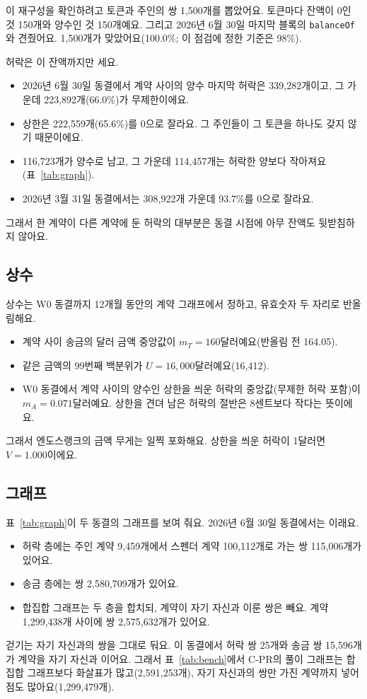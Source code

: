 이 재구성을 확인하려고 토큰과 주인의 쌍 1,500개를 뽑았어요. 토큰마다 잔액이 0인 것 150개와 양수인 것 150개예요. 그리고 2026년 6월 30일 마지막 블록의 \texttt{balanceOf}와 견줬어요. 1,500개가 맞았어요(100.0\%; 이 점검에 정한 기준은 98\%).

허락은 이 잔액까지만 세요.
\begin{itemize}
\item 2026년 6월 30일 동결에서 계약 사이의 양수 마지막 허락은 339,282개이고, 그 가운데 223,892개(66.0\%)가 무제한이에요.
\item 상한은 222,559개(65.6\%)를 0으로 잘라요. 그 주인들이 그 토큰을 하나도 갖지 않기 때문이에요.
\item 116,723개가 양수로 남고, 그 가운데 114,457개는 허락한 양보다 작아져요(표~\ref{tab:graph}).
\item 2026년 3월 31일 동결에서는 308,922개 가운데 93.7\%를 0으로 잘라요.
\end{itemize}
그래서 한 계약이 다른 계약에 둔 허락의 대부분은 동결 시점에 아무 잔액도 뒷받침하지 않아요.

\subsection{상수}
\label{sec:constants}

상수는 W0 동결까지 12개월 동안의 계약 그래프에서 정하고, 유효숫자 두 자리로 반올림해요.
\begin{itemize}
\item 계약 사이 송금의 달러 금액 중앙값이 $m_T=160$달러예요(반올림 전 164.05).
\item 같은 금액의 99번째 백분위가 $U=16{,}000$달러예요(16,412).
\item W0 동결에서 계약 사이의 양수인 상한을 씌운 허락의 중앙값(무제한 허락 포함)이 $m_A=0.071$달러예요. 상한을 견뎌 남은 허락의 절반은 8센트보다 작다는 뜻이에요.
\end{itemize}
그래서 엔도스랭크의 금액 무게는 일찍 포화해요. 상한을 씌운 허락이 1달러면 $V=1.000$이에요.

\subsection{그래프}
\label{sec:graphs}

표~\ref{tab:graph}이 두 동결의 그래프를 보여 줘요. 2026년 6월 30일 동결에서는 이래요.
\begin{itemize}
\item 허락 층에는 주인 계약 9,459개에서 스펜더 계약 100,112개로 가는 쌍 115,006개가 있어요.
\item 송금 층에는 쌍 2,580,709개가 있어요.
\item 합집합 그래프는 두 층을 합치되, 계약이 자기 자신과 이룬 쌍은 빼요. 계약 1,299,438개 사이에 쌍 2,575,632개가 있어요.
\end{itemize}
걷기는 자기 자신과의 쌍을 그대로 둬요. 이 동결에서 허락 쌍 25개와 송금 쌍 15,596개가 계약을 자기 자신과 이어요. 그래서 표~\ref{tab:bench}에서 C-PR의 풀이 그래프는 합집합 그래프보다 화살표가 많고(2,591,253개), 자기 자신과의 쌍만 가진 계약까지 넣어 점도 많아요(1,299,479개).

